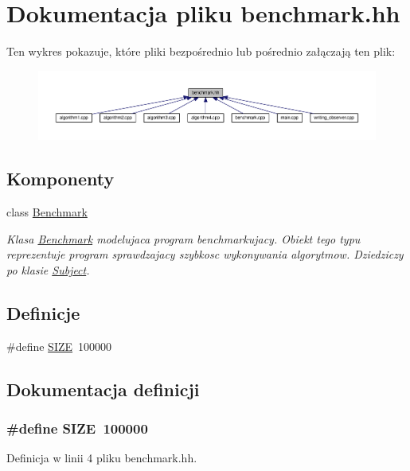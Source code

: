 \hypertarget{benchmark_8hh}{\section{Dokumentacja pliku benchmark.\-hh}
\label{benchmark_8hh}
}
Ten wykres pokazuje, które pliki bezpośrednio lub pośrednio załączają ten plik\-:
\nopagebreak
\begin{figure}[H]
\begin{center}
\leavevmode
\includegraphics[width=350pt]{benchmark_8hh__dep__incl}
\end{center}
\end{figure}
\subsection*{Komponenty}
\begin{DoxyCompactItemize}
\item 
class \hyperlink{class_benchmark}{Benchmark}
\begin{DoxyCompactList}\small\item\em Klasa \hyperlink{class_benchmark}{Benchmark} modelujaca program benchmarkujacy. Obiekt tego typu reprezentuje program sprawdzajacy szybkosc wykonywania algorytmow. Dziedziczy po klasie \hyperlink{class_subject}{Subject}. \end{DoxyCompactList}\end{DoxyCompactItemize}
\subsection*{Definicje}
\begin{DoxyCompactItemize}
\item 
\#define \hyperlink{benchmark_8hh_a70ed59adcb4159ac551058053e649640}{S\-I\-Z\-E}~100000
\end{DoxyCompactItemize}


\subsection{Dokumentacja definicji}
\hypertarget{benchmark_8hh_a70ed59adcb4159ac551058053e649640}{
\subsubsection[{S\-I\-Z\-E}]{\setlength{\rightskip}{0pt plus 5cm}\#define S\-I\-Z\-E~100000}}\label{benchmark_8hh_a70ed59adcb4159ac551058053e649640}


Definicja w linii 4 pliku benchmark.\-hh.

